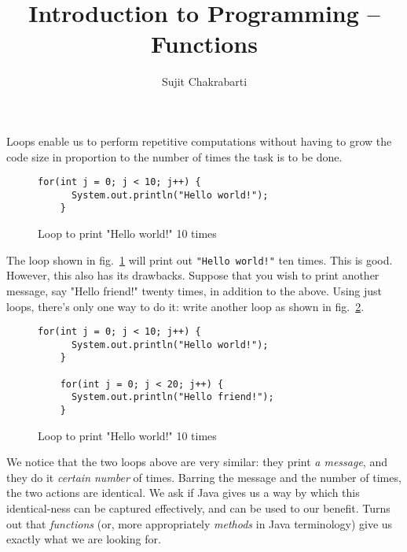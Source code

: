 \documentclass[12pt,a4paper]{article}
\author{Sujit Chakrabarti}
\title{Introduction to Programming -- Functions}
\date{}
\begin{document}

\newcommand{\highlight}[1]{{\color{Red}(#1)}}
\newcommand{\comment}[1]{{\color{Blue}#1}}


\maketitle

Loops enable us to perform repetitive computations without having to grow the code size in proportion to the number of times the task is to be done.

\begin{figure}[H]
\begin{lstlisting}[frame=single]
    for(int j = 0; j < 10; j++) {
      System.out.println("Hello world!");
    }
\end{lstlisting}
\caption{Loop to print "Hello world!" 10 times}
\label{f:loop1}
\end{figure}
The loop shown in fig.~\ref{f:loop1} will print out \texttt{"Hello world!"} ten times. This is good. However, this also has its drawbacks. Suppose that you wish to print another message, say "Hello friend!" twenty times, in addition to the above. Using just loops, there's only one way to do it: write another loop as shown in fig.~\ref{f:loop2}.
\begin{figure}[H]
\begin{lstlisting}[frame=single]
    for(int j = 0; j < 10; j++) {
      System.out.println("Hello world!");
    }

    for(int j = 0; j < 20; j++) {
      System.out.println("Hello friend!");
    }
\end{lstlisting}
\caption{Loop to print "Hello world!" 10 times}
\label{f:loop2}
\end{figure}

We notice that the two loops above are very similar: they print \emph{a message}, and they do it \emph{certain number} of times. Barring the message and the number of times, the two actions are identical. We ask if Java gives us a way by which this identical-ness can be captured effectively, and can be used to our benefit. Turns out that \emph{functions} (or, more appropriately \emph{methods} in Java terminology) give us exactly what we are looking for.
\end{document}
